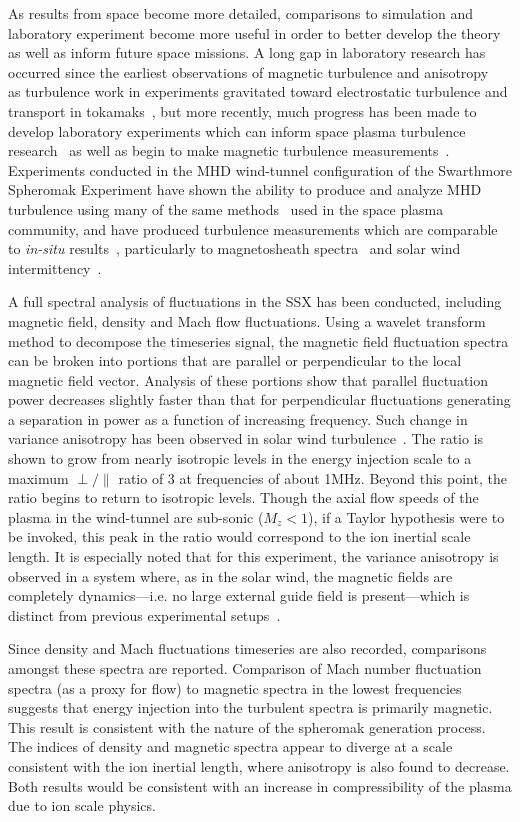 \documentclass[manuscript]{aastex}
\begin{document}
As results from space become more detailed, comparisons to simulation and laboratory experiment become more useful in order to better develop the theory as well as inform future space missions. A long gap in laboratory research has occurred since the earliest observations of magnetic turbulence and anisotropy~\citep{rob71} as turbulence work in experiments gravitated toward electrostatic turbulence and transport in tokamaks~\citep{lie85,tyn09}, but more recently, much progress has been made to develop laboratory experiments which can inform space plasma turbulence research~\citep{how12} as well as begin to make magnetic turbulence measurements~\citep{ren11}. Experiments conducted in the MHD wind-tunnel configuration of the Swarthmore Spheromak Experiment have shown the ability to produce and analyze MHD turbulence using many of the same methods~\citep{dud13} used in the space plasma community, and have produced turbulence measurements which are comparable to \textit{in-situ} results~\citep{sch14a,sch14b}, particularly to magnetosheath spectra~\citep{yor08} and solar wind intermittency~\citep{sor99}.

A full spectral analysis of fluctuations in the SSX has been conducted, including magnetic field, density and Mach flow fluctuations. Using a wavelet transform method to decompose the timeseries signal, the magnetic field fluctuation spectra can be broken into portions that are parallel or perpendicular to the local magnetic field vector. Analysis of these portions show that parallel fluctuation power decreases slightly faster than that for perpendicular fluctuations generating a separation in power as a function of increasing frequency. Such change in variance anisotropy has been observed in solar wind turbulence~\citep{kiy13}. The ratio is shown to grow from nearly isotropic levels in the energy injection scale to a maximum $\perp/\parallel$ ratio of 3 at frequencies of about 1MHz.  Beyond this point, the ratio begins to return to isotropic levels. Though the axial flow speeds of the plasma in the wind-tunnel are sub-sonic ($M_{z} < 1$), if a Taylor hypothesis were to be invoked, this peak in the ratio would correspond to the ion inertial scale length. It is especially noted that for this experiment, the variance anisotropy is observed in a system where, as in the solar wind, the magnetic fields are completely dynamics---i.e. no large external guide field is present---which is distinct from previous experimental setups~\citep{rob71,ren11}.

Since density and Mach fluctuations timeseries are also recorded, comparisons amongst these spectra are reported. Comparison of Mach number fluctuation spectra (as a proxy for flow) to magnetic spectra in the lowest frequencies suggests that energy injection into the turbulent spectra is primarily magnetic. This result is consistent with the nature of the spheromak generation process. The indices of density and magnetic spectra appear to diverge at a scale consistent with the ion inertial length, where anisotropy is also found to decrease. Both results would be consistent with an increase in compressibility of the plasma due to ion scale physics.
\end{document}
